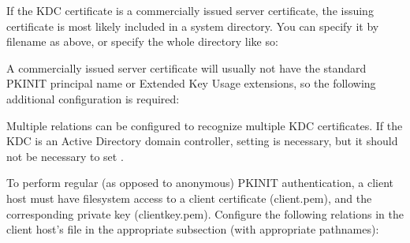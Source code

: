 \documentclass[letterpaper,10pt,english]{sphinxmanual}
\begin{document}
%
\begin{sphinxVerbatim}[commandchars=\\\{\}]
  
\end{sphinxVerbatim}

If the KDC certificate is a commercially issued server certificate,
the issuing certificate is most likely included in a system directory.
You can specify it by filename as above, or specify the whole
directory like so:

%
\begin{sphinxVerbatim}[commandchars=\\\{\}]
  
\end{sphinxVerbatim}

A commercially issued server certificate will usually not have the
standard PKINIT principal name or Extended Key Usage extensions, so
the following additional configuration is required:

%
\begin{sphinxVerbatim}[commandchars=\\\{\}]
  
  
\end{sphinxVerbatim}

Multiple  relations can be configured to
recognize multiple KDC certificates.  If the KDC is an Active
Directory domain controller, setting  is
necessary, but it should not be necessary to set
.

To perform regular (as opposed to anonymous) PKINIT authentication, a
client host must have filesystem access to a client certificate
(client.pem), and the corresponding private key (clientkey.pem).
Configure the following relations in the client host’s
{\hyperref[\detokenize{admin/conf_files/krb5_conf:krb5-conf-5}]{}} file in the appropriate {\hyperref[\detokenize{admin/conf_files/krb5_conf:realms}]{}} subsection
(with appropriate pathnames):
\end{document}
